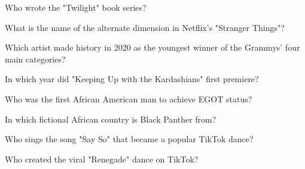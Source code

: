 \documentclass[12pt,a4paper]{book}
\begin{document}
\begin{enhancedmcq}[Question 3]{Who wrote the "Twilight" book series?}
\end{enhancedmcq}

\begin{enhancedmcq}[Question 4]{What is the name of the alternate dimension in Netflix's "Stranger Things"?}
\end{enhancedmcq}

\begin{enhancedmcq}[Question 5]{Which artist made history in 2020 as the youngest winner of the Grammys' four main categories?}
\end{enhancedmcq}

\begin{enhancedmcq}[Question 6]{In which year did "Keeping Up with the Kardashians" first premiere?}
\end{enhancedmcq}

\begin{enhancedmcq}[Question 7]{Who was the first African American man to achieve EGOT status?}
\end{enhancedmcq}

\begin{enhancedmcq}[Question 8]{In which fictional African country is Black Panther from?}
\end{enhancedmcq}

\begin{enhancedmcq}[Question 9]{Who sings the song "Say So" that became a popular TikTok dance?}
\end{enhancedmcq}

\begin{enhancedmcq}[Question 10]{Who created the viral "Renegade" dance on TikTok?}
\end{enhancedmcq}
\end{document}
